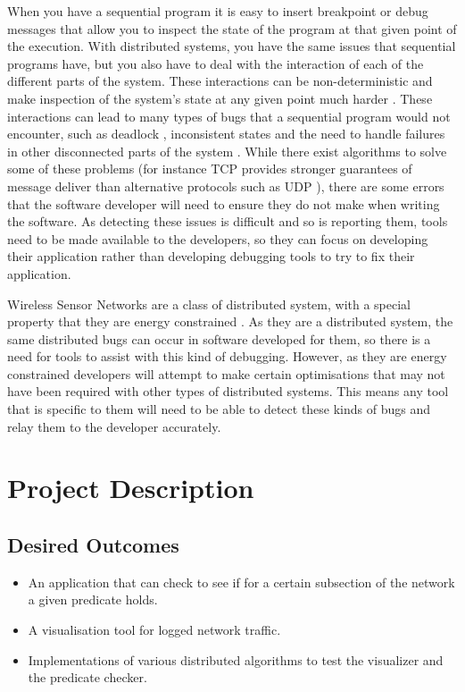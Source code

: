 \documentclass[a4paper]{article}
\begin{document}
When you have a sequential program it is easy to insert breakpoint or debug messages that allow you to inspect the state of the program at that given point of the execution. With distributed systems, you have the same issues that sequential programs have, but you also have to deal with the interaction of each of the different parts of the system. These interactions can be non-deterministic \cite{liu2007wids} and make inspection of the system's state at any given point much harder \cite{?}. These interactions can lead to many types of bugs that a sequential program would not encounter, such as deadlock \cite{singhal1989deadlock}, inconsistent states \cite{?} and the need to handle failures in other disconnected parts of the system \cite{?}. While there exist algorithms to solve some of these problems (for instance TCP provides stronger guarantees of message deliver than alternative protocols such as UDP \cite[p.~532]{Tanenbaum:2002:CN:572404}), there are some errors that the software developer will need to ensure they do not make when writing the software. As detecting these issues is difficult and so is reporting them, tools need to be made available to the developers, so they can focus on developing their application rather than developing debugging tools to try to fix their application.

Wireless Sensor Networks are a class of distributed system, with a special property that they are energy constrained \cite{6023235}.  As they are a distributed system, the same distributed bugs can occur in software developed for them, so there is a need for tools to assist with this kind of debugging. However, as they are energy constrained developers will attempt to make certain optimisations that may not have been required with other types of distributed systems. This means any tool that is specific to them will need to be able to detect these kinds of bugs and relay them to the developer accurately.


\section{Project Description}

\subsection{Desired Outcomes}
\begin{itemize}
	\item An application that can check to see if for a certain subsection of the network a given predicate holds.
	\item A visualisation tool for logged network traffic.
	\item Implementations of various distributed algorithms to test the visualizer and the predicate checker.
\end{itemize}
\end{document}
